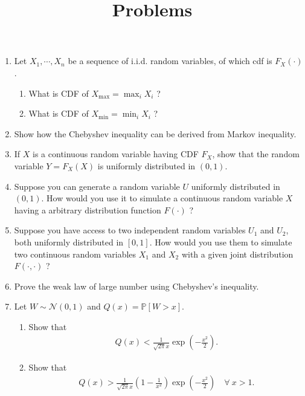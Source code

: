 \documentclass{article}
\title{Problems}
\begin{document}
\maketitle
\begin{enumerate}
\item Let $X_1,\cdots,X_n$ be a sequence of i.i.d. random variables, of which cdf is $F_X(\cdot)$.

\begin{enumerate}


\item What is CDF of $X_\text{max}=\max_i X_i$ ?



\item What is CDF of $X_\text{min}=\min_i X_i$ ?

\end{enumerate}

\item Show how the Chebyshev inequality can be derived from Markov inequality.

\item If $X$ is a continuous random variable having CDF $F_X$, show that the random variable $Y=F_X(X)$ is uniformly distributed in $(0,1)$.

\item Suppose you can generate a random variable $U$ uniformly distributed in $(0,1)$. How would you use it to simulate a continuous random variable $X$ having a arbitrary distribution function $F(\cdot)$ ? 


\item  Suppose you have access to two independent random variables $U_1$ and $U_2$, both uniformly distributed in $[0,1]$.
How would you use them to simulate two continuous random variables $X_1$ and $X_2$ with a given joint distribution $F(\cdot,\cdot)$ ?


\item Prove the weak law of large number using Chebyshev's inequality.


\item Let $W\sim\mathcal{N}(0,1)$ and $Q(x)=\mathbb{P}[W>x]$.

\begin{enumerate}
\item Show that
	\begin{align*}
	Q(x)<\frac{1}{\sqrt{2\pi}x}\exp\left(-\frac{x^2}{2}\right).	
	\end{align*}
	

\item Show that
	\begin{align*}
	Q(x)>\frac{1}{\sqrt{2\pi}x}\left(1-\frac{1}{x^2}\right)\exp\left(-\frac{x^2}{2}\right)\quad\forall~x>1.
	\end{align*}
	


\end{enumerate}
\end{enumerate}
\end{document}
